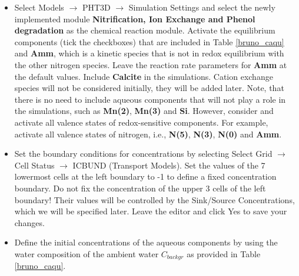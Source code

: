 \begin{itemize}

\item Select Models $\rightarrow$ PHT3D $\rightarrow$ Simulation Settings and select 
the newly implemented module {\color{red} \textbf{Nitrification, Ion Exchange and Phenol degradation}} as the chemical reaction module. 
Activate the equilibrium components (tick the checkboxes) that are included
in Table \ref{bruno_caqu} and {\color{red} \textbf{Amm}}, which is a kinetic species
that is not in redox equilibrium with the other nitrogen species.
Leave the reaction rate parameters for {\color{red} \textbf{Amm}} at the default values.
Include {\color{red} \textbf{Calcite}} in the simulations. Cation exchange species will
not be considered initially, they will be added later.
Note, that there is no need to include aqueous components that will not play a role
in the simulations, such as {\color{red} \textbf{Mn(2)}}, {\color{red} \textbf{Mn(3)}} and  {\color{red} \textbf{Si}}. However, consider and activate all valence
states of redox-sensitive components. For example, activate all valence states of nitrogen,
i.e., {\color{red} \textbf{N(5)}}, {\color{red} \textbf{N(3)}}, {\color{red} \textbf{N(0)}} and {\color{red} \textbf{Amm}}. 

\item Set the boundary conditions for concentrations by selecting Select Grid $\rightarrow$ Cell Status $\rightarrow$ ICBUND (Transport Models). Set the values of the 7 lowermost cells at the left boundary to -1 to define a fixed concentration boundary. Do not fix the concentration of the upper 3 cells of the left boundary! Their values will be controlled by the Sink/Source Concentrations, which we will be specified later. Leave the editor and click Yes to save your changes.

\item Define the initial concentrations of the aqueous components by using the water composition of the ambient water $C_{backgr}$ as provided in Table \ref{bruno_caqu}. 

\end{itemize}

